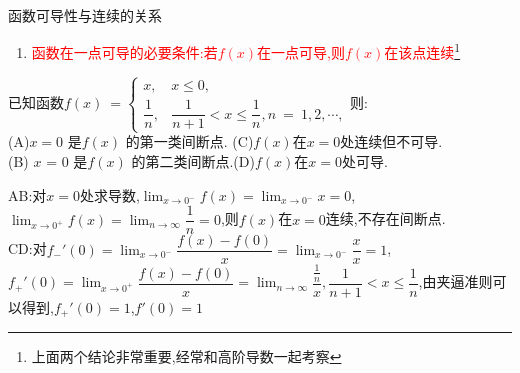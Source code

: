 \documentclass[8pt a4paper, oneside, UTF8]{ctexbook}  %
\begin{document}
\begin{sloppypar}
\begin{criterion}{函数可导性与连续的关系}{}
\begin{enumerate}
\begin{proof}[导数若存在有震荡间断点的证明:]
            \end{proof}
            上述推论还可以用几何来解释.如果$x=0$处的导数存在,那么其函数图像在原点一定有切线.
                      \begin{figure}[H]
                          \begin{minipage}[t]{0.5\linewidth}
                              \centering
                              \texttt{[image: 3.2.3.eps]}
                              \caption{振荡间断点函数$\sin \dfrac{1}{x}$图像}
                          \end{minipage}%
                          \begin{minipage}[t]{0.5\linewidth}
                              \centering
                              \texttt{[image: 1.2.2.eps]}
                              \caption{双曲余弦函数$y=\dfrac{e^x+e^{-x}}{2}$}
                          \end{minipage}
                      \end{figure}
            同时,导数震荡的话,则导数极限不存在,由此可以推出衍生推论:导数极限定理\ref{dsjxdl}
            \item \textcolor{red}{函数在一点可导的必要条件:若$f(x)$在一点可导,则$f(x)$在该点连续}\footnote{上面两个结论非常重要,经常和高阶导数一起考察}
        \end{enumerate}
    \end{criterion}
    \begin{problem}
        已知函数$f(x)\:=\begin{cases}
            x,&x\leqslant0,\\
            \dfrac{1}{n},&\dfrac{1}{n+1} < x \leq \dfrac{1}{n},n\:=\:1,2,\cdots,\end{cases}$则:\\
        (A)$x=0$ 是$f(x)$ 的第一类间断点. \quad (C)$f(x)$在$x=0$处连续但不可导.\\
        (B) $x$ = 0 是$f(x)$ 的第二类间断点.\quad (D)$f(x)$在$x=0$处可导.
    \end{problem}
    \begin{solution}
        AB:对$x=0$处求导数,$\lim_{x\to 0^-}f(x)=\lim_{x\to 0^-}x=0$,$\lim_{x\to 0^+}f(x)=\lim_{n\to \infty}\dfrac{1}{n}=0$,则$f(x)$在$x=0$连续,不存在间断点.\\
        CD:对$f_-'(0)=\lim_{x\to 0^-}\dfrac{f(x)-f(0)}{x}=\lim_{x\to 0^-}\dfrac{x}{x}=1$,$f_+'(0)=\lim_{x\to 0^+}\dfrac{f(x)-f(0)}{x}=\lim_{n\to \infty}\dfrac{\frac{1}{n}}{x},\dfrac{1}{n+1}<x \leqslant \dfrac{1}{n}$,由夹逼准则可以得到,$f_+'(0)=1$,$f'(0)=1$\\

\end{solution}
\end{sloppypar}
\end{document}
